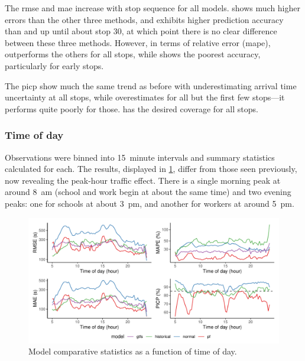 The \gls{rmse} and \gls{mae} increase with stop sequence for all models. \Fnorm{} shows much higher errors than the other three methods, and \Fpf{} exhibits higher prediction accuracy than \Fhist{} and \Fsched{} up until about stop 30, at which point there is no clear difference between these three methods. However, in terms of relative error (\gls{mape}), \Fpf{} outperforms the others for all stops, while \Fhist{} shows the poorest accuracy, particularly for early stops.


The \gls{picp} show much the same trend as before with \Fpf{} underestimating arrival time uncertainty at all stops, while \Fnorm{} overestimates for all but the first few stops---it performs quite poorly for those. \Fhist{} has the desired coverage for all stops.


\subsubsection{Time of day}

Observations were binned into 15~minute intervals and summary statistics calculated for each. The results, displayed in \cref{fig:model_results_rmse_timeofday}, differ from those seen previously, now revealing the peak-hour traffic effect. There is a single morning peak at around 8~am (school and work begin at about the same time) and two evening peaks: one for schools at about 3~pm, and another for workers at around 5~pm.


\begin{knitrout}\small
{}\color{fgcolor}\begin{figure}
\includegraphics[width=\textwidth]{figure/model_results_rmse_timeofday-1} \caption[Model comparative statistics as a function of time of day]{Model comparative statistics as a function of time of day.}\label{fig:model_results_rmse_timeofday}
\end{figure}


\end{knitrout}

